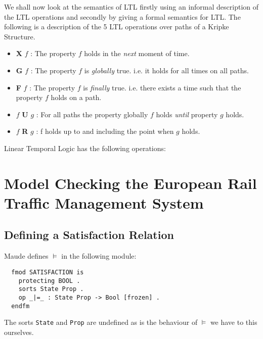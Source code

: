 We shall now look at the semantics of LTL firstly using an informal description of the LTL operations and secondly by giving a formal semantics for LTL. The following is a description of the 5 LTL operations over paths of a Kripke Structure.

\begin{itemize}
\item \textbf{X} $f$ : The property $f$ holds in the \emph{next} moment of time.
\item \textbf{G} $f$ : The property $f$ is \emph{globally} true. i.e. it holds for all times on all paths. 
\item \textbf{F} $f$ : The property $f$ is \emph{finally} true. i.e. there exists a time such that the property $f$ holds on a path.
\item $f$ \textbf{U} $g$ : For all paths the property globally $f$ holds \emph{until} property $g$ holds. 
\item $f$ \textbf{R} $g$ : f holds up to and including the point when $g$ holds.
\end{itemize}

\begin{mydef}
Linear Temporal Logic has the following operations:


\end{mydef}





\section{Model Checking the European Rail Traffic Management System}



\subsection*{Defining a Satisfaction Relation}

Maude defines $\models$ in the following module:
\begin{verbatim}
  fmod SATISFACTION is  
    protecting BOOL .  
    sorts State Prop .  
    op _|=_ : State Prop -> Bool [frozen] .  
  endfm
\end{verbatim}
The sorts \texttt{State} and \texttt{Prop} are undefined as is the behaviour of $\models$ we have to this ourselves.


